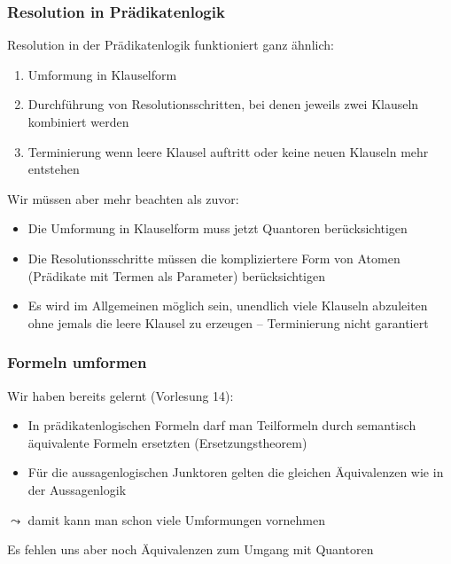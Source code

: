 \documentclass[aspectratio=1610,onlymath]{beamer}
\begin{document}
\begin{frame}\frametitle{Resolution in Prädikatenlogik}

Resolution in der Prädikatenlogik funktioniert ganz ähnlich:
\begin{enumerate}[(1)]
\item Umformung in Klauselform
\item Durchführung von Resolutionsschritten, bei denen jeweils zwei Klauseln kombiniert werden
\item Terminierung wenn leere Klausel auftritt oder keine neuen Klauseln mehr entstehen
\end{enumerate}
\bigskip

Wir müssen aber mehr beachten als zuvor:
\begin{itemize}
\item Die Umformung in Klauselform muss jetzt \alert{Quantoren} berücksichtigen
\item Die Resolutionsschritte müssen die \alert{kompliziertere Form von Atomen} (Prädikate mit Termen als Parameter) berücksichtigen
\item Es wird im Allgemeinen möglich sein, unendlich viele Klauseln abzuleiten ohne jemals die leere Klausel zu erzeugen -- \alert{Terminierung nicht garantiert}
\end{itemize}

\end{frame}


\begin{frame}\frametitle{Formeln umformen}

Wir haben bereits gelernt (Vorlesung 14):
\begin{itemize}
\item In prädikatenlogischen Formeln darf man Teilformeln durch semantisch äquivalente
Formeln ersetzten (Ersetzungstheorem)
\item Für die aussagenlogischen Junktoren gelten die gleichen Äquivalenzen wie in der Aussagenlogik
\end{itemize}
$\leadsto$ damit kann man schon viele Umformungen vornehmen
\bigskip

Es fehlen uns aber noch Äquivalenzen zum Umgang mit Quantoren

\end{frame}
\end{document}
